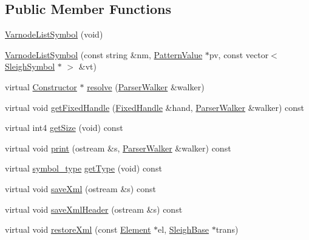 \subsection*{Public Member Functions}
\begin{DoxyCompactItemize}
\item 
\mbox{\hyperlink{class_varnode_list_symbol_a3926cfa7e2c864a644dc61dd9fedc5e7}{Varnode\+List\+Symbol}} (void)
\item 
\mbox{\hyperlink{class_varnode_list_symbol_a6e3922af9a7d8647fec38e3d305b1b92}{Varnode\+List\+Symbol}} (const string \&nm, \mbox{\hyperlink{class_pattern_value}{Pattern\+Value}} $\ast$pv, const vector$<$ \mbox{\hyperlink{class_sleigh_symbol}{Sleigh\+Symbol}} $\ast$ $>$ \&vt)
\item 
virtual \mbox{\hyperlink{class_constructor}{Constructor}} $\ast$ \mbox{\hyperlink{class_varnode_list_symbol_a6757d4ecc0f1844adf14b8370835602a}{resolve}} (\mbox{\hyperlink{class_parser_walker}{Parser\+Walker}} \&walker)
\item 
virtual void \mbox{\hyperlink{class_varnode_list_symbol_aa4366d8c21b4969bff3cefde9893b25c}{get\+Fixed\+Handle}} (\mbox{\hyperlink{struct_fixed_handle}{Fixed\+Handle}} \&hand, \mbox{\hyperlink{class_parser_walker}{Parser\+Walker}} \&walker) const
\item 
virtual int4 \mbox{\hyperlink{class_varnode_list_symbol_a5958ff2358b0884cf1696eff69d51a18}{get\+Size}} (void) const
\item 
virtual void \mbox{\hyperlink{class_varnode_list_symbol_a3dbd47d58a39197a6126fec8a0b11be4}{print}} (ostream \&s, \mbox{\hyperlink{class_parser_walker}{Parser\+Walker}} \&walker) const
\item 
virtual \mbox{\hyperlink{class_sleigh_symbol_aba70f7f332fd63488c5ec4bd7807db41}{symbol\+\_\+type}} \mbox{\hyperlink{class_varnode_list_symbol_a2b543f4f683e29a4e044726051173897}{get\+Type}} (void) const
\item 
virtual void \mbox{\hyperlink{class_varnode_list_symbol_a4b95e5f5b2c0ebd4a0eee076c9ed96de}{save\+Xml}} (ostream \&s) const
\item 
virtual void \mbox{\hyperlink{class_varnode_list_symbol_ab94e4dd41289435b00157190e6ba6a71}{save\+Xml\+Header}} (ostream \&s) const
\item 
virtual void \mbox{\hyperlink{class_varnode_list_symbol_a61923762838951414bd2c84454652d44}{restore\+Xml}} (const \mbox{\hyperlink{class_element}{Element}} $\ast$el, \mbox{\hyperlink{class_sleigh_base}{Sleigh\+Base}} $\ast$trans)
\end{DoxyCompactItemize}

